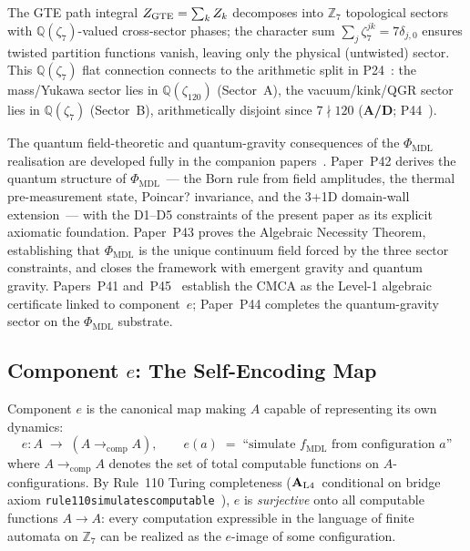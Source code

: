 \documentclass[12pt,letterpaper]{article}
\newcommand{\fmdl}{f_{\mathrm{MDL}}}
\newcommand{\Zseven}{\mathbb{Z}_7}
\newcommand{\catAL}{\ensuremath{\textbf{A}_{\rm L4}}}
\newcommand{\catAD}{\textbf{A/D}}
\newcommand{\lean}[1]{%
  \penalty-100
  \begingroup\def\_{\textunderscore\allowbreak}\texttt{#1}\endgroup}
\begin{document}
The GTE path integral $Z_{\rm GTE} = \sum_k Z_k$ decomposes into $\mathbb{Z}_7$
topological sectors with $\mathbb{Q}(\zeta_7)$-valued cross-sector phases; the character
sum $\sum_j \zeta_7^{jk} = 7\delta_{j,0}$ ensures twisted partition functions vanish,
leaving only the physical (untwisted) sector.  This $\mathbb{Q}(\zeta_7)$ flat connection
connects to the arithmetic split in P24~\cite{SpivackDeeperTheory}: the mass/Yukawa sector
lies in $\mathbb{Q}(\zeta_{120})$ (Sector~A), the vacuum/kink/QGR sector lies in
$\mathbb{Q}(\zeta_7)$ (Sector~B), arithmetically disjoint since $7 \nmid 120$
(\catAD; P44~\cite{SpivackQGR}).

The quantum field-theoretic and quantum-gravity consequences of the $\Phi_\mathrm{MDL}$ realisation are developed fully in the companion papers~\cite{SpivackPhiMDLField,SpivackCompleteness,SpivackQGR}. Paper~P42 derives the quantum structure of $\Phi_\mathrm{MDL}$~--- the Born rule from field amplitudes, the thermal pre-measurement state, Poincar? invariance, and the 3+1D domain-wall extension~--- with the D1--D5 constraints of the present paper as its explicit axiomatic foundation. Paper~P43 proves the Algebraic Necessity Theorem, establishing that $\Phi_\mathrm{MDL}$ is the unique continuum field forced by the three sector constraints, and closes the framework with emergent gravity and quantum gravity. Papers~P41 and~P45~\cite{SpivackCMCA,SpivackThreeTapeCMCA} establish the CMCA as the Level-1 algebraic certificate linked to component~$e$; Paper~P44 completes the quantum-gravity sector on the $\Phi_\mathrm{MDL}$ substrate.

\subsection{Component \texorpdfstring{$e$}{e}: The Self-Encoding Map}
\label{sec:encoding}

Component $e$ is the canonical map making $A$ capable of representing its own
dynamics:
\begin{equation}
  e : A \;\longrightarrow\; (A \to_{\mathrm{comp}} A),\qquad
  e(a) \;=\; \text{``simulate } \fmdl \text{ from configuration } a\text{''}
  \label{eq:e-map}
\end{equation}
where $A \to_{\mathrm{comp}} A$ denotes the set of total computable functions on
$A$-configurations.  By Rule~110 Turing completeness (\catAL\ conditional on bridge
axiom \lean{rule110\_simulates\_computable}~\cite{SpivackCookTheorem}), $e$ is \emph{surjective}
onto all computable functions $A \to A$: every computation expressible in the
language of finite automata on $\Zseven$ can be realized as the $e$-image of some
configuration.
\end{document}
